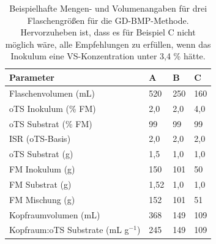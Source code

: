 \documentclass[]{article}
\begin{document}
\begin{table}[h] 
\centering
\caption{Beispielhafte Mengen- und Volumenangaben für drei Flaschengrößen für die GD-BMP-Methode. Hervorzuheben ist, dass es für Beispiel C nicht möglich wäre, alle Empfehlungen zu erfüllen, wenn das Inokulum eine VS-Konzentration unter 3,4 \% hätte.}
\label{tab:examples}
\begin{tabular}{llll}
\hline
Parameter                     & A    & B   & C   \\
\hline
Flaschenvolumen (mL)      & 520  & 250 & 160 \\
oTS Inokulum (\% FM)           & 2,0  & 2,0 & 4,0 \\
oTS Substrat (\% FM)          & 99   & 99  & 99  \\
ISR (oTS-Basis)                & 2,0  & 2,0 & 2,0 \\
oTS Substrat (g)              & 1,5 & 1,0 & 1,0 \\
FM Inokulum (g)               & 150  & 101 & 50  \\
FM Substrat (g)              & 1,52 & 1,0 & 1,0 \\
FM Mischung (g)                & 152  & 101 & 51  \\
Kopfraumvolumen (mL)         & 368  & 149 & 109 \\
Kopfraum:oTS Substrate (mL g$^{-1}$) & 245  & 149 & 109 \\
\hline
\end{tabular}
\end{table}
\end{document}
